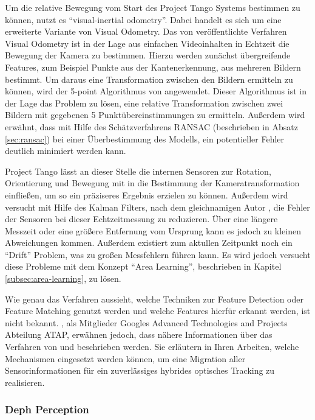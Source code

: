 Um die relative Bewegung vom Start des Project Tango Systems bestimmen zu können, nutzt es \enquote{visual-inertial odometry}. \citep{GoogleDevelopersConcepts:online}
Dabei handelt es sich um eine erweiterte Variante von Visual Odometry. 
Das von \citet{nister2004visual} veröffentlichte Verfahren Visual Odometry ist in der Lage aus einfachen Videoinhalten in Echtzeit die Bewegung der Kamera zu bestimmen. 
Hierzu werden zunächst übergreifende Features, zum Beispiel Punkte aus der \citet{harris1988combined} Kantenerkennung, aus mehreren Bildern bestimmt. Um daraus eine Transformation zwischen den Bildern ermitteln zu können, wird der 5-point Algorithmus von \citet{nister2004efficient} angewendet. Dieser Algorithmus ist in der Lage das Problem zu lösen, eine relative Transformation zwischen zwei Bildern mit gegebenen 5 Punktübereinstimmungen zu ermitteln. Außerdem wird erwähnt, dass mit Hilfe des Schätzverfahrens RANSAC (beschrieben in Absatz \ref{sec:ransac}) bei einer Überbestimmung des Modells, ein potentieller Fehler deutlich minimiert werden kann. 

Project Tango lässt an dieser Stelle die internen Sensoren zur Rotation, Orientierung und Bewegung mit in die Bestimmung der Kameratransformation einfließen, um so ein präziseres Ergebnis erzielen zu können. Außerdem wird versucht mit Hilfe des Kalman Filters, nach dem gleichnamigen Autor \citet{kalman1960new}, die Fehler der Sensoren bei dieser Echtzeitmessung zu reduzieren. Über eine längere Messzeit oder eine größere Entfernung vom Ursprung kann es jedoch zu kleinen Abweichungen kommen. Außerdem existiert zum aktullen Zeitpunkt noch ein \enquote{Drift} Problem, was zu großen Messfehlern führen kann. Es wird jedoch versucht diese Probleme mit dem Konzept \enquote{Area Learning}, beschrieben in Kapitel \ref{subsec:area-learning}, zu lösen. \citep{GoogleDevelopersConcepts:online}

Wie genau das Verfahren aussieht, welche Techniken zur Feature Detection oder Feature Matching genutzt werden und welche Features hierfür erkannt werden, ist nicht bekannt. \citet{Klingensmith_2015_7924}, als Mitglieder Googles Advanced Technologies and Projects Abteilung ATAP, erwähnen jedoch, dass nähere Informationen über das Verfahren von \citet{kottas2013consistency} und \citet{mourikis2007multi} beschrieben werden. Sie erläutern in Ihren Arbeiten, welche Mechanismen eingesetzt werden können, um eine Migration aller Sensorinformationen für ein zuverlässiges hybrides optisches Tracking zu realisieren.

\subsubsection{Deph Perception}

